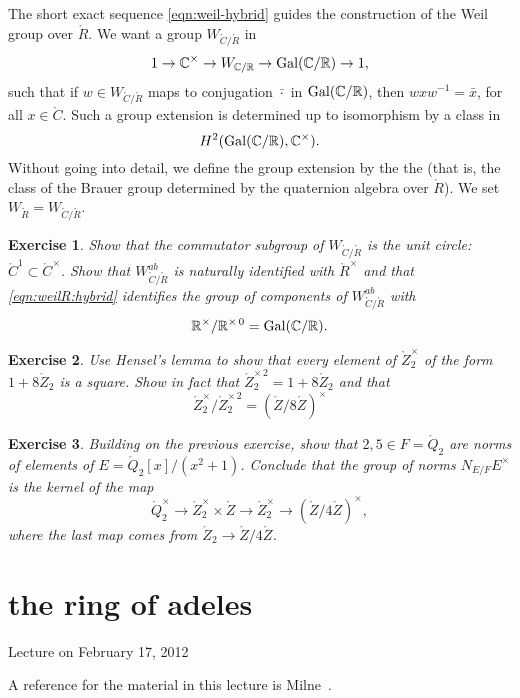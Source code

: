 \documentclass{amsart}
\newtheorem{exercise}{Exercise}
\def\CC{\ring{C}}
\def\RR{\ring{R}}
\def\ZZ{\ring{Z}}
\def\oG{\op{Gal}}
\begin{document}
The short exact sequence \eqref{eqn:weil-hybrid} guides the
construction of the Weil group over $\RR$.  We want a group
$W_{\CC/\RR}$ in
\begin{equation}\label{eqn:weilR:hybrid}
1 \to \CC^\times \to W_{\CC/\RR} \to \oG(\CC/\RR) \to 1,
\end{equation}
such that if $w\in W_{\CC/\RR}$ maps to conjugation $\bar \cdot$ in
$\oG(\CC/\RR)$, then $w x w^{-1} = \bar x$, for all $x\in\CC$.
Such a group extension is determined up to isomorphism by a class in
\[
H^2(\oG(\CC/\RR),\CC^\times).
\]
Without going into detail, we define the group extension by the the
 (that is, the class of the
Brauer group determined by the quaternion algebra over $\ring{R}$).
We set $W_\RR = W_{\CC/\RR}$.

\begin{exercise} Show that the commutator subgroup of $W_{\CC/\RR}$ is
 the unit circle:  $\CC^1\subset \CC^\times$.  Show that
  $W^{ab}_{\CC/\RR}$ is naturally identified with $\RR^\times$ and
  that \eqref{eqn:weilR:hybrid} identifies the group of components of
  $W^{ab}_{\CC/\RR}$ with
\[
\RR^\times/\RR^{\times\,0}=
\oG(\CC/\RR).
\]
\end{exercise}

\begin{exercise} Use Hensel's lemma to show that every element of
$\ring{Z}_2^\times$ of the form $1 + 8\ring{Z}_2$ is a square.  Show
in fact that $\ring{Z}_2^{\times\, 2}=1 + 8 \ring{Z}_2$ and that
\[
\ring{Z}_2^\times / \ring{Z}_2^{\times\, 2} = (\ring{Z}/8\ring{Z})^\times
\]
\end{exercise}

\begin{exercise}  Building on the previous exercise, show that $2, 5\in F=\ring{Q}_2$
are norms of elements of $E=\ring{Q}_2[x]/(x^2+1)$.  Conclude that the group
of norms $N_{E/F} E^\times$ is the kernel of the map
\[
\ring{Q}^\times _2 \to \ring{Z}^\times_2\times \ring{Z} \to 
\ring{Z}_2^\times \to (\ZZ/4\ZZ)^\times,
\]
where the last map comes from $\ring{Z}_2\to \ring{Z}/4\ring{Z}$.
\end{exercise}

\newpage
\section{the ring of adeles}

Lecture on February 17, 2012

A reference for the material in this lecture is Milne~\cite{CFT}.
\end{document}
